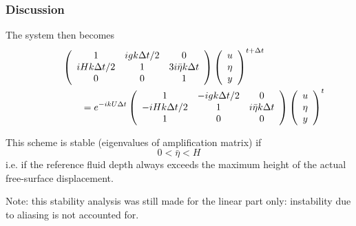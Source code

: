 \documentclass[aspectratio=43,9pt]{beamer}
\begin{document}
\begin{frame}
	\frametitle{Discussion}
	\begin{myitemize}{4ex}
		\item The system then becomes
			\begin{align*}
				&\left(\begin{array}{ccc}
					1	&	igk\Delta t/2	&	0	\\
					iHk\Delta t/2	&	1	& 3i\bar\eta k\Delta t	\\
					0	&	0	&	1
				\end{array}\right) \left(\begin{array}{c}u \\ \eta \\ y \end{array}\right)^{t+\Delta t}	\\
				&\qquad=
				e^{-ikU\Delta t}
				\left(\begin{array}{ccc}
					1	&	-igk\Delta t/2	&	0	\\
					-iHk\Delta t/2	&	1	&	i\bar\eta k\Delta t	\\
					1 & 0	&	0
				\end{array}\right) \left(\begin{array}{c}u \\ \eta \\ y \end{array}\right)^{t}\hspace*{-3em}
			\end{align*}
		\item This scheme is stable (eigenvalues of amplification matrix) if 
			\begin{equation*}
				0< \bar \eta < H
			\end{equation*}
			i.e. if the reference fluid depth always exceeds the maximum height of the actual free-surface displacement.
		\item Note: this stability analysis was still made for the linear part only: instability due to aliasing is not accounted for.
	\end{myitemize}
\end{frame}
%
%
\end{document}
